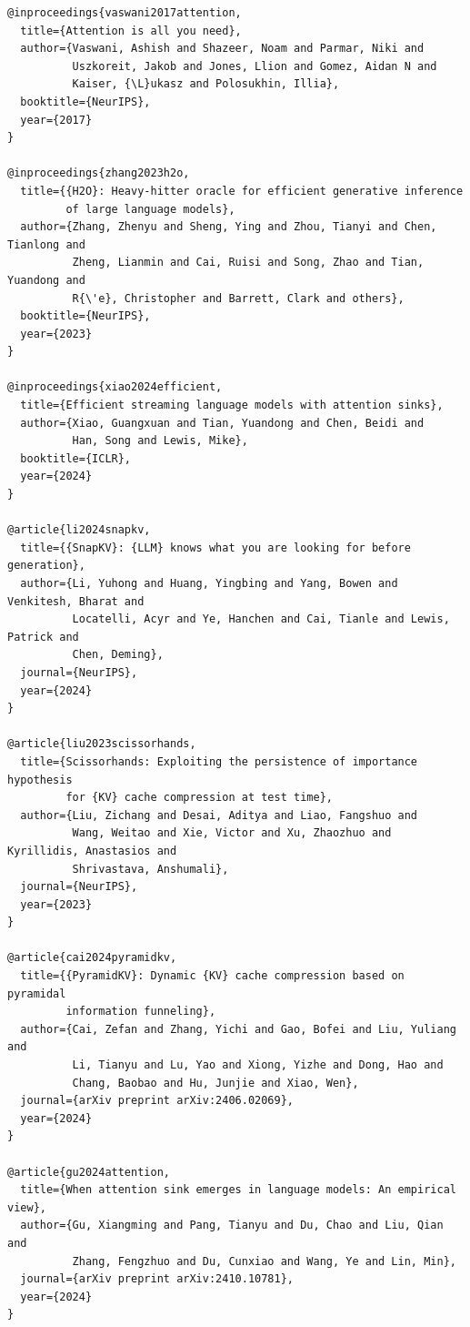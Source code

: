 \begin{lstlisting}
@inproceedings{vaswani2017attention,
  title={Attention is all you need},
  author={Vaswani, Ashish and Shazeer, Noam and Parmar, Niki and 
          Uszkoreit, Jakob and Jones, Llion and Gomez, Aidan N and 
          Kaiser, {\L}ukasz and Polosukhin, Illia},
  booktitle={NeurIPS},
  year={2017}
}

@inproceedings{zhang2023h2o,
  title={{H2O}: Heavy-hitter oracle for efficient generative inference 
         of large language models},
  author={Zhang, Zhenyu and Sheng, Ying and Zhou, Tianyi and Chen, Tianlong and 
          Zheng, Lianmin and Cai, Ruisi and Song, Zhao and Tian, Yuandong and 
          R{\'e}, Christopher and Barrett, Clark and others},
  booktitle={NeurIPS},
  year={2023}
}

@inproceedings{xiao2024efficient,
  title={Efficient streaming language models with attention sinks},
  author={Xiao, Guangxuan and Tian, Yuandong and Chen, Beidi and 
          Han, Song and Lewis, Mike},
  booktitle={ICLR},
  year={2024}
}

@article{li2024snapkv,
  title={{SnapKV}: {LLM} knows what you are looking for before generation},
  author={Li, Yuhong and Huang, Yingbing and Yang, Bowen and Venkitesh, Bharat and 
          Locatelli, Acyr and Ye, Hanchen and Cai, Tianle and Lewis, Patrick and 
          Chen, Deming},
  journal={NeurIPS},
  year={2024}
}

@article{liu2023scissorhands,
  title={Scissorhands: Exploiting the persistence of importance hypothesis 
         for {KV} cache compression at test time},
  author={Liu, Zichang and Desai, Aditya and Liao, Fangshuo and 
          Wang, Weitao and Xie, Victor and Xu, Zhaozhuo and Kyrillidis, Anastasios and 
          Shrivastava, Anshumali},
  journal={NeurIPS},
  year={2023}
}

@article{cai2024pyramidkv,
  title={{PyramidKV}: Dynamic {KV} cache compression based on pyramidal 
         information funneling},
  author={Cai, Zefan and Zhang, Yichi and Gao, Bofei and Liu, Yuliang and 
          Li, Tianyu and Lu, Yao and Xiong, Yizhe and Dong, Hao and 
          Chang, Baobao and Hu, Junjie and Xiao, Wen},
  journal={arXiv preprint arXiv:2406.02069},
  year={2024}
}

@article{gu2024attention,
  title={When attention sink emerges in language models: An empirical view},
  author={Gu, Xiangming and Pang, Tianyu and Du, Chao and Liu, Qian and 
          Zhang, Fengzhuo and Du, Cunxiao and Wang, Ye and Lin, Min},
  journal={arXiv preprint arXiv:2410.10781},
  year={2024}
}


\end{lstlisting}
